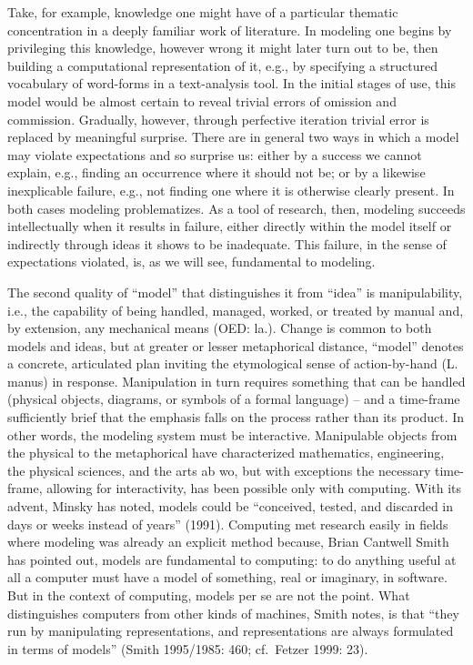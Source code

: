 Take, for example, knowledge one might have of a particular thematic
concentration in a deeply familiar work of literature. In modeling one
begins by privileging this knowledge, however wrong it might later turn
out to be, then building a computational representation of it, e.g., by
specifying a structured vocabulary of word-forms in a text-analysis
tool. In the initial stages of use, this model would be almost certain
to reveal trivial errors of omission and commission. Gradually, however,
through perfective iteration trivial error is replaced by meaningful
surprise. There are in general two ways in which a model may violate
expectations and so surprise us: either by a success we cannot explain,
e.g., finding an occurrence where it should not be; or by a likewise
inexplicable failure, e.g., not finding one where it is otherwise
clearly present. In both cases modeling problematizes. As a tool of
research, then, modeling succeeds intellectually when it results in
failure, either directly within the model itself or indirectly through
ideas it shows to be inadequate. This failure, in the sense of
expectations violated, is, as we will see, fundamental to modeling.

The second quality of ``model'' that distinguishes it from ``idea'' is
manipulability, i.e., the capability of being handled, managed, worked,
or treated by manual and, by extension, any mechanical means (OED: la.).
Change is common to both models and ideas, but at greater or lesser
metaphorical distance, ``model'' denotes a concrete, articulated plan
inviting the etymological sense of action-by-hand (L. manus) in
response. Manipulation in turn requires something that can be handled
(physical objects, diagrams, or symbols of a formal language) -- and a
time-frame sufficiently brief that the emphasis falls on the process
rather than its product. In other words, the modeling system must be
interactive. Manipulable objects from the physical to the metaphorical
have characterized mathematics, engineering, the physical sciences, and
the arts ab wo, but with exceptions the necessary time-frame, allowing
for interactivity, has been possible only with computing. With its
advent, Minsky has noted, models could be ``conceived, tested, and
discarded in days or weeks instead of years'' (1991). Computing met
research easily in fields where modeling was already an explicit method
because, Brian Cantwell Smith has pointed out, models are fundamental to
computing: to do anything useful at all a computer must have a model of
something, real or imaginary, in software. But in the context of
computing, models per se are not the point. What distinguishes computers
from other kinds of machines, Smith notes, is that ``they run by
manipulating representations, and representations are always formulated
in terms of models'' (Smith 1995/1985: 460; cf.~Fetzer 1999: 23).

